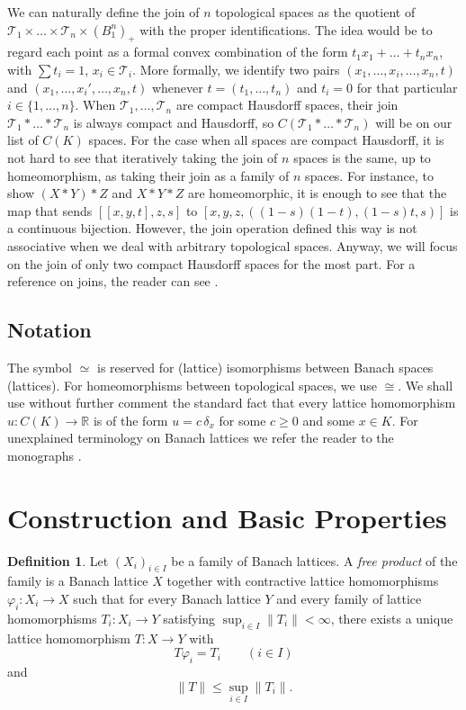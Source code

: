 \documentclass[12pt]{amsart}
\theoremstyle{plain}
\theoremstyle{definition}
\newtheorem{definition}[theorem]{Definition}
\begin{document}
 We can naturally define the join of $n$ topological spaces as the quotient of $\mathcal T_1\times\ldots\times \mathcal T_n\times (B_1^n)_+$ with the proper identifications. The idea would be to regard each point as a formal convex combination of the form $t_1x_1+\ldots+t_nx_n$, with $\sum t_i=1$, $x_i\in \mathcal T_i$. More formally, we identify two pairs $(x_1,\ldots,x_i,\ldots,x_n,t)$ and $(x_1,\ldots,x_i',\ldots,x_n,t)$ whenever $t=(t_1,\ldots,t_n)$ and $t_i=0$ for that particular $i\in\{1,\ldots,n\}$. When $\mathcal T_1,\ldots,\mathcal T_n$ are compact Hausdorff spaces, their join $\mathcal T_1*\ldots*\mathcal T_n$ is always compact and Hausdorff, so $C(\mathcal T_1*\ldots*\mathcal T_n)$ will be on our list of $C(K)$ spaces. For the case when all spaces are compact Hausdorff, it is not hard to see that iteratively taking the join of $n$ spaces is the same, up to homeomorphism, as taking their join as a family of $n$ spaces. For instance, to show $(X*Y)*Z$ and $X*Y*Z$ are homeomorphic, it is enough to see that the map that sends $[[x,y,t],z,s]$ to $[x,y,z,((1-s)(1-t),(1-s)t,s)]$ is a continuous bijection. However, the join operation defined this way is not associative when we deal with arbitrary topological spaces. Anyway, we will focus on the join of only two compact Hausdorff spaces for the most part. For a reference on joins, the reader can see \cite{hatcher}.

\subsection{Notation} 
The symbol $\simeq$ is reserved for (lattice) isomorphisms between Banach spaces (lattices). For homeomorphisms between topological spaces, we use $\cong$. We shall use without further comment the standard fact that every lattice homomorphism $u:C(K)\to \mathbb{R}$ is of the form $u=c\,\delta_x$ for some $c\geq 0$ and some $x\in K$. 
For unexplained terminology on Banach lattices we refer the reader to the monographs \cite{burkinshaw,LT2,nieberg}.

\section{Construction and Basic Properties}\label{sec:construction}

\begin{definition}
Let $(X_i)_{i\in I}$ be a family of Banach lattices. A \emph{free product} of the family is a Banach lattice $X$ together with contractive lattice homomorphisms $\varphi_i:X_i\to X$ such that for every Banach lattice $Y$ and every family of lattice homomorphisms $T_i:X_i\to Y$ satisfying $\sup_{i\in I}\|T_i\|<\infty$, there exists a unique lattice homomorphism $T:X\to Y$ with
\[
T\varphi_i=T_i \qquad (i\in I)
\]
and
\[
\|T\|\leq \sup_{i\in I}\|T_i\|.
\]
\end{definition}
\end{document}
